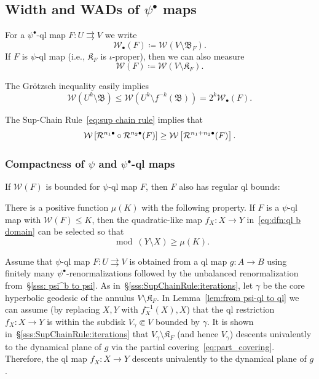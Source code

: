 \documentclass{amsart}
\newcommand{\filled}{{\mathfrak K }}
\newcommand{\bush}{{\mathfrak B }}
\newcommand{\1}{{\mathbb 1 }}
\newcommand{\Width}{{\mathcal W}}
\begin{document}
\subsection{Width and WADs of $\psi^\bullet$ maps}\label{ss:Width+WAD}

 For a $\psi^\bullet$-ql map $F\colon U\rightrightarrows V$ we write \[\Width_\bullet(F)\coloneqq \Width(V\setminus \bush_F).\] 
 If $F$ is $\psi$-ql map  (i.e., $\filled_F$ is $\iota$-proper), then we can also measure
  \[\Width(F)\coloneqq \Width(V\setminus \filled_F).\] 
 
 
The Gr\"otzsch inequality easily implies 
\[
 \Width\left(U^k\setminus \bush\right)\le\Width\left(U^k\setminus f^{-k}(\bush)\right)= 2^k\Width_\bullet(F).
\]

The Sup-Chain Rule~\eqref{eq:sup chain rule} implies that
\begin{equation}
\label{eq:width:sup chain rule}
\Width\left[\RR^{n_1\bullet} \circ \RR^{n_2 \bullet} (F) \right] \ge \Width\left[ \RR^{n_1+n_2 \bullet} (F)\right].
\end{equation}


 
 \subsubsection{Compactness of $\psi$ and $\psi^\bullet$-ql maps}\label{sss:compactness}  If $\Width(F)$ is bounded for $\psi$-ql map $F$, then $F$ also has regular ql bounds: 

\begin{lem}[{\cite[Lemma 2.4]{K}}]
\label{lem:from psi-ql to ql}
There is a positive function $\mu(K)$ with the following property. If $F$ is a $\psi$-ql map with $\Width(F)\le K$, then the quadratic-like map $f_X\colon X\to Y$ in~\eqref{eq:dfn:ql b domain} can be selected so that    
\begin{equation}
\label{eq:lem:from psi-ql to ql}\mod \left(Y\setminus X \right) \ge \mu(K).
\end{equation}
\end{lem}

\begin{rem}
\label{rem:lem:from psi-ql to ql}  Assume that $\psi$-ql map $F\colon U\rightrightarrows V$ is obtained from a ql map $g\colon A\to B$ using finitely many $\psi^\bullet$-renormalizations followed by the unbalanced renormalization from~\S\ref{sss: psi^b to psi}. As in~\S\ref{sss:SupChainRule:iterations},  let $\gamma$ be the core hyperbolic geodesic of the annulus $V\setminus \filled_F$. In Lemma~\ref{lem:from psi-ql to ql} we can assume (by replacing $X,Y$ with $ f_X^{-1}(X),X$) that the ql restriction $f_X\colon X\to Y$ is within the subdisk $V_\gamma\Subset V$ bounded by $\gamma$. It is shown in~\S\ref{sss:SupChainRule:iterations} that $V_\gamma\setminus \filled_F$ (and hence $V_\gamma$) descents univalently to the dynamical plane of $g$ via the partial covering~\eqref{eq:part_covering}. Therefore, the ql map $f_X\colon X\to Y$ descents univalently to the dynamical plane of $g$.
\end{rem}
\end{document}
